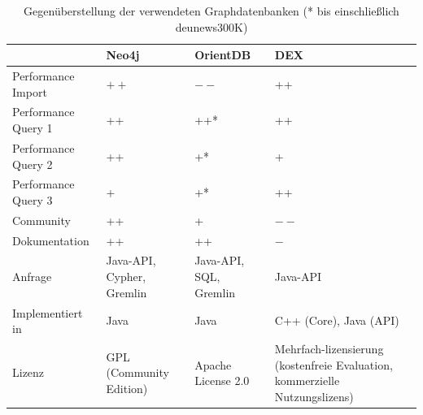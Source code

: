 \documentclass[11pt, a4paper, oneside]{article} %
\begin{document}
\renewcommand{\arraystretch}{1.5}

\begin{table}[ht]
\begin{tabular}{|l||p{2.5cm}|p{2.5cm}|p{2.5cm}|}
\hline 
 & \textbf{Neo4j} & \textbf{OrientDB} & \textbf{DEX} \\ 
\hline
Performance Import & $++$ & $--$ & ++ \\ 
\hline 
Performance Query 1 & ++ & ++* & ++ \\ 
\hline 
Performance Query 2 & ++ & +* & + \\ 
\hline 
Performance Query 3 & + & +* & ++ \\ 
\hline
Community & ++ & + & $--$ \\ 
\hline 
Dokumentation & ++ & ++ & $-$ \\
\hline 
Anfrage & Java-API, Cypher, Gremlin & Java-API, SQL, Gremlin & Java-API \\
\hline
Implementiert in & Java & Java & C++ (Core), Java (API) \\
\hline 
Lizenz & GPL (Community Edition) & Apache License 2.0 & Mehrfach-lizensierung (kostenfreie Evaluation, kommerzielle Nutzungslizens)	 \\ 
\hline 
\end{tabular}
\caption{Gegenüberstellung der verwendeten Graphdatenbanken (* bis einschließlich deu\textunderscore news\textunderscore 300K)}
\label{tab:compare}
\end{table}

\newpage
\end{document}
